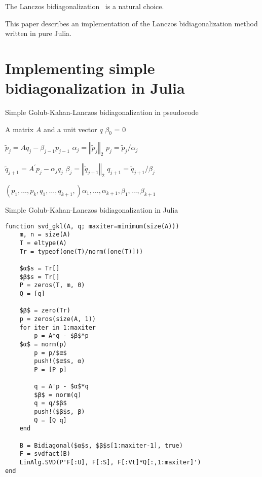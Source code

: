 \documentclass[final,leqno]{siamltex1213}
\begin{document}
The Lanczos bidiagonalization~\cite{Golub1965} is a natural choice.

This paper describes an implementation of the Lanczos bidiagonalization
method written in pure Julia.


\section{Implementing simple bidiagonalization in Julia}

\begin{algorithm}
\caption{Simple Golub-Kahan-Lanczos bidiagonalization in pseudocode}

\begin{algorithmic}
\REQUIRE A matrix $A$ and a unit vector $q$
\STATE $\beta_0$ = 0

\STATE $\tilde{p}_j = A q_j - \beta_{j-1} p_{j-1}$
\STATE $\alpha_j = \left\Vert \tilde{p}_j \right\Vert_2$
\STATE $p_j = \tilde{p}_j / \alpha_j$

\STATE $\tilde{q}_{j+1} = A^\prime p_j - \alpha_j q_j$
\STATE $\beta_j = \left\Vert \tilde{q}_{j+1} \right\Vert_2$
\STATE $q_{j+1} = \tilde{q}_{j+1} / \beta_j$

\ENDFOR
\RETURN $\left(p_1, \dots, p_k, q_1, \dots, q_{k+1},\right) \alpha_1, \dots, \alpha_{k+1}, \beta_1, \dots, \beta_{k+1}$
\end{algorithmic}
\end{algorithm}



\begin{algorithm}
\caption{Simple Golub-Kahan-Lanczos bidiagonalization in Julia}

\begin{lstlisting}
function svd_gkl(A, q; maxiter=minimum(size(A)))
    m, n = size(A)
    T = eltype(A)
    Tr = typeof(one(T)/norm([one(T)]))

    $α$s = Tr[]
    $β$s = Tr[]
    P = zeros(T, m, 0)
    Q = [q]

    $β$ = zero(Tr)
    p = zeros(size(A, 1))
    for iter in 1:maxiter
        p = A*q - $β$*p
	$α$ = norm(p)
        p = p/$α$
        push!($α$s, α)
        P = [P p]

        q = A'p - $α$*q
        $β$ = norm(q)
        q = q/$β$
        push!($β$s, β)
        Q = [Q q]
    end

    B = Bidiagonal($α$s, $β$s[1:maxiter-1], true)
    F = svdfact(B)
    LinAlg.SVD(P'F[:U], F[:S], F[:Vt]*Q[:,1:maxiter]')
end
\end{lstlisting}
\end{algorithm}
\end{document}
